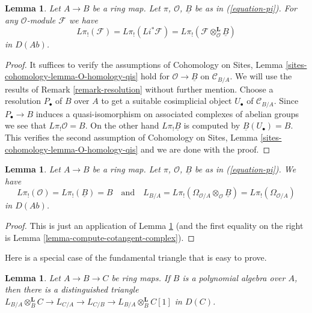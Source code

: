 \documentclass{stacks-project}
\theoremstyle{plain}
\newtheorem{lemma}[subsection]{Lemma}
\theoremstyle{definition}
\theoremstyle{remark}
\numberwithin{equation}{subsection}
\begin{document}
\begin{lemma}
\label{lemma-O-homology-B-homology}
Let $A \to B$ be a ring map. Let $\pi$, $\mathcal{O}$, $\underline{B}$
be as in (\ref{equation-pi}). For any $\mathcal{O}$-module $\mathcal{F}$
we have
$$
L\pi_!(\mathcal{F}) = L\pi_!(Li^*\mathcal{F}) =
L\pi_!(\mathcal{F} \otimes_\mathcal{O}^\mathbf{L} \underline{B})
$$
in $D(\textit{Ab})$.
\end{lemma}

\begin{proof}
It suffices to verify the assumptions of Cohomology on Sites, Lemma
\ref{sites-cohomology-lemma-O-homology-qis}
hold for $\mathcal{O} \to \underline{B}$ on $\mathcal{C}_{B/A}$.
We will use the results of Remark \ref{remark-resolution} without
further mention. Choose a resolution $P_\bullet$ of $B$ over $A$ to get a
suitable cosimplicial object $U_\bullet$ of $\mathcal{C}_{B/A}$.
Since $P_\bullet \to B$ induces a quasi-isomorphism on associated
complexes of abelian groups we see that $L\pi_!\mathcal{O} = B$.
On the other hand $L\pi_!\underline{B}$ is computed by
$\underline{B}(U_\bullet) = B$. This verifies the second assumption of
Cohomology on Sites, Lemma
\ref{sites-cohomology-lemma-O-homology-qis}
and we are done with the proof.
\end{proof}

\begin{lemma}
\label{lemma-apply-O-B-comparison}
Let $A \to B$ be a ring map. Let $\pi$, $\mathcal{O}$, $\underline{B}$
be as in (\ref{equation-pi}). We have
$$
L\pi_!(\mathcal{O}) = L\pi_!(\underline{B}) = B
\quad\text{and}\quad
L_{B/A} = L\pi_!(\Omega_{\mathcal{O}/A} \otimes_\mathcal{O} \underline{B}) =
L\pi_!(\Omega_{\mathcal{O}/A})
$$
in $D(\textit{Ab})$.
\end{lemma}

\begin{proof}
This is just an application of Lemma \ref{lemma-O-homology-B-homology}
(and the first equality on the right is
Lemma \ref{lemma-compute-cotangent-complex}).
\end{proof}

\noindent
Here is a special case of the fundamental triangle that is easy to prove.

\begin{lemma}
\label{lemma-special-case-triangle}
Let $A \to B \to C$ be ring maps. If $B$ is a polynomial algebra over
$A$, then there is a distinguished triangle 
$L_{B/A} \otimes_B^\mathbf{L} C \to L_{C/A} \to L_{C/B} \to
L_{B/A} \otimes_B^\mathbf{L} C[1]$ in $D(C)$.
\end{lemma}
\end{document}
